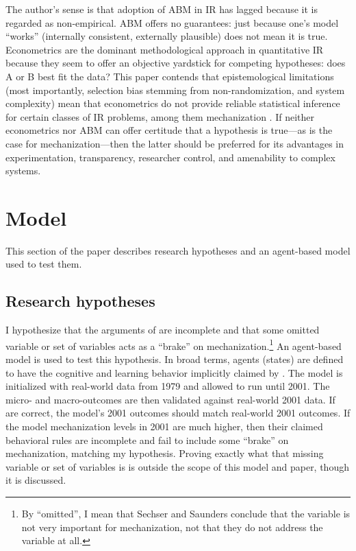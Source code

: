\documentclass{article}
\begin{document}
The author's sense is that adoption of ABM in IR has lagged because it is
regarded as non-empirical. ABM offers no guarantees: just
because one's model ``works'' (internally consistent, externally plausible) 
does not mean it is true. Econometrics are the dominant methodological approach 
in quantitative IR because they seem to offer an objective yardstick for competing hypotheses: 
does A or B best fit the data? This paper contends that
epistemological limitations (most importantly, selection bias stemming from
non-randomization, and system complexity) mean that econometrics do not
provide reliable statistical inference for certain classes of IR problems, among
them mechanization \citep[c.f.][for a concurring opinion]{king2010hard}. 
If neither econometrics nor ABM can offer 
certitude that a hypothesis is true---as is the case for mechanization---then the latter 
should be preferred for its advantages in experimentation, transparency, researcher control, 
and amenability to complex systems.

\section{Model}

This section of the paper describes research hypotheses and an agent-based
model used to test them. 

\subsection{Research hypotheses}

I hypothesize that the arguments of \citet{sechser2010army} are incomplete and
that some omitted variable or set of variables acts as a ``brake'' on 
mechanization.\footnote{By ``omitted'', I mean that Sechser and Saunders conclude that the variable
is not very important for mechanization, not that they do not address the
variable at all.} An agent-based model is used to test this hypothesis. In broad
terms, agents (states) are defined to have the cognitive and learning behavior
implicitly claimed by \citet{sechser2010army}. The model is initialized with
real-world data from 1979 and allowed to run until 2001. The micro- and
macro-outcomes are then validated against real-world 2001 data. If
\citet{sechser2010army} are correct, the model's 2001 outcomes should match
real-world 2001 outcomes. If the model mechanization levels in 2001 are much
higher, then their claimed behavioral rules are incomplete and fail to include
some ``brake'' on mechanization, matching my hypothesis. Proving exactly what
that missing variable or set of variables is is outside the scope of this model
and paper, though it is discussed.
\end{document}
